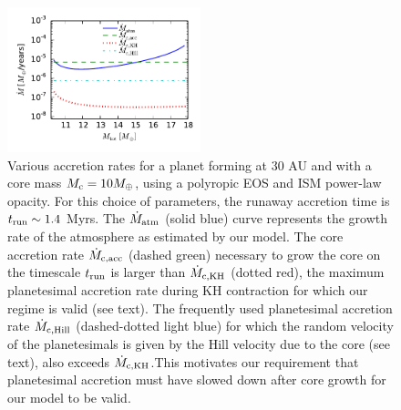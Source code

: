 

 \begin{figure}[htb]
\centering
\includegraphics[width=0.5\textwidth]{figures/acc_rates_paper.pdf}
\caption{Various accretion rates for a planet forming at 30 AU and with a core mass $M_{\rm c}=10 M_{\oplus}$, using a polyropic EOS and ISM power-law opacity. For this choice of parameters, the runaway accretion time is $t_{\rm run} \sim 1.4$ Myrs. The $\dot{M}_{\rm{atm}}$ (solid blue) curve represents the growth rate of the atmosphere as estimated by our model. The core accretion rate $\dot{M}_{\rm c, acc}$ (dashed green) necessary to grow the core on the timescale $t_{\rm run}$ is larger than $\dot{M}_{\rm c, KH}$ (dotted red), the maximum planetesimal accretion rate during KH contraction for which our regime is valid (see text). The frequently used planetesimal accretion rate $\dot{M}_{\rm c, Hill}$ (dashed-dotted light blue) for which the random velocity of the planetesimals is given by the Hill velocity due to the core (see text), also exceeds $\dot{M}_{\rm c, KH}$.This motivates our requirement  that planetesimal accretion must have slowed down after core growth for our model to be valid.}

\label{fig:accrates}
\end{figure}


